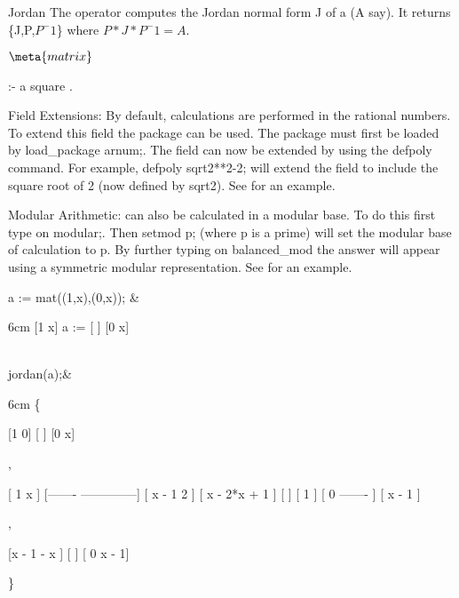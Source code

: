 \begin{Operator}{Jordan}
The operator  computes the Jordan normal form J
of a  (A say). It returns \{J,P,$P^-1$\} where $P*J*P^-1 = A$.

\begin{Syntax}
\(\meta{matrix}\)

 :- a square .
\end{Syntax}

Field Extensions:
By default, calculations are performed in the rational numbers. To 
extend this field the  package can be used. The package must
first be loaded by  load\_package arnum;. The field can now be extended
by using the defpoly command. For example, defpoly sqrt2**2-2; will
extend the field to include the square root of 2 (now defined by sqrt2).
See  for an example.

Modular Arithmetic:
 can also be calculated in a modular base. To do this 
first type on  modular;. Then setmod p; (where p is a prime) will set 
the modular base of calculation to p. By further typing on balanced\_mod
the answer will appear using a symmetric modular representation. See
 for an example.

\begin{Examples}

 a := mat((1,x),(0,x)); &
\begin{multilineoutput}{6cm}
     [1  x]
a := [    ]
     [0  x]
\end{multilineoutput}\\

 jordan(a);&
\begin{multilineoutput}{6cm}
\{

 [1  0]
 [    ]
 [0  x]

 ,


 [   1           x       ]
 [-------  --------------]
 [ x - 1     2           ]
 [          x  - 2*x + 1 ]
 [                       ]
 [               1       ]
 [   0        -------    ]
 [             x - 1     ]

 ,


 [x - 1   - x ]
 [            ]
 [  0    x - 1]

 \}
\end{multilineoutput}\\
\end{Examples}

\end{Operator}

